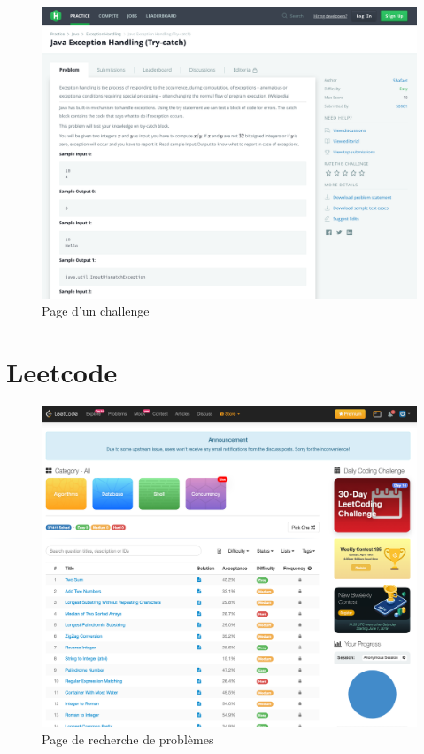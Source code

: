 \begin{figure}[H]
    \includegraphics[width=\textwidth,height=0.55\textheight,keepaspectratio]{images/comparison/hacker-3.png}
    \centering
    \caption[Hackerrank : page d'un challenge]{Page d'un challenge}
\end{figure}

\section{Leetcode}

\begin{figure}[H]
    \includegraphics[width=\textwidth,height=0.6\textheight,keepaspectratio]{images/comparison/leetcode-1.png}
    \centering
    \caption[Leetcode : page de recherche de problèmes]{Page de recherche de problèmes}
\end{figure}

